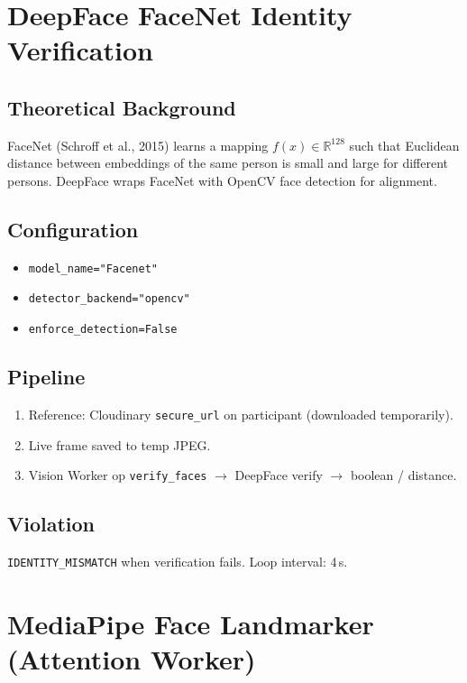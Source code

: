 \documentclass[11pt,a4paper]{report}
\begin{document}
\section{DeepFace FaceNet Identity Verification}

\subsection{Theoretical Background}
FaceNet (Schroff et al., 2015) learns a mapping $f(x) \in \mathbb{R}^{128}$ such that Euclidean distance between embeddings of the same person is small and large for different persons. DeepFace wraps FaceNet with OpenCV face detection for alignment.

\subsection{Configuration}
\begin{itemize}
  \item \texttt{model\_name="Facenet"}
  \item \texttt{detector\_backend="opencv"}
  \item \texttt{enforce\_detection=False}
\end{itemize}

\subsection{Pipeline}
\begin{enumerate}
  \item Reference: Cloudinary \texttt{secure\_url} on participant (downloaded temporarily).
  \item Live frame saved to temp JPEG.
  \item Vision Worker op \texttt{verify\_faces} $\rightarrow$ DeepFace verify $\rightarrow$ boolean / distance.
\end{enumerate}

\subsection{Violation}
\texttt{IDENTITY\_MISMATCH} when verification fails. Loop interval: 4\,s.

\section{MediaPipe Face Landmarker (Attention Worker)}
\end{document}
